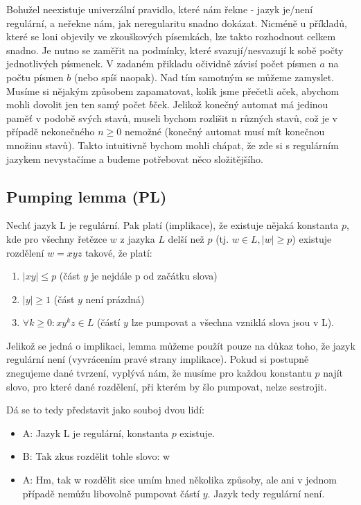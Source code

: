 \documentclass{article}
\begin{document}
Bohužel neexistuje univerzální pravidlo, které nám řekne - jazyk je/není regulární, a neřekne nám, jak neregularitu snadno dokázat.
Nicméně u příkladů, které se loni objevily ve zkouškových písemkách, lze takto rozhodnout celkem snadno.
Je nutno se zaměřit na podmínky, které svazují/nesvazují k sobě počty jednotlivých písmenek.
V zadaném přikladu očividně závisí počet písmen $a$ na počtu písmen $b$ (nebo spíš naopak).
Nad tím samotným se můžeme zamyslet.
Musíme si nějakým způsobem zapamatovat, kolik jsme přečetli $a$ček, abychom mohli dovolit jen ten samý počet $b$ček.
Jelikož konečný automat má jedinou paměť v podobě svých stavů, museli bychom rozlišit n různých stavů, což je v případě nekonečného $n \geq 0$ nemožné (konečný automat musí mít konečnou množinu stavů).
Takto intuitivně bychom mohli chápat, že zde si s regulárním jazykem nevystačíme a budeme potřebovat něco složitějšího.

\subsection{Pumping lemma (PL)}

Nechť jazyk L je regulární. Pak platí (implikace), že existuje nějaká konstanta $p$, kde pro všechny řetězce $w$ z jazyka $L$ delší než $p$ (tj. $w \in L, |w| \geq p$) existuje rozdělení $w = xyz$ takové, že platí:
\begin{enumerate}
\item $|xy| \leq p$ (část $y$ je nejdále p od začátku slova)
\item $|y| \geq 1$ (část $y$ není prázdná)
\item $\forall k \geq 0: xy^kz \in L$ (částí $y$ lze pumpovat a všechna vzniklá slova jsou v L).
\end{enumerate}


Jelikož se jedná o implikaci, lemma můžeme použít pouze na důkaz toho, že jazyk regulární není (vyvrácením pravé strany implikace). Pokud si postupně znegujeme dané tvrzení, vyplývá nám, že musíme pro každou konstantu $p$ najít slovo, pro které dané rozdělení, při kterém by šlo pumpovat, nelze sestrojit.

Dá se to tedy představit jako souboj dvou lidí:
\begin{itemize}
\item A: Jazyk L je regulární, konstanta $p$ existuje.
\item B: Tak zkus rozdělit tohle slovo: w
\item A: Hm, tak w rozdělit sice umím hned několika způsoby, ale ani v jednom případě nemůžu libovolně pumpovat částí $y$. Jazyk tedy regulární není.
\end{itemize}
\end{document}
